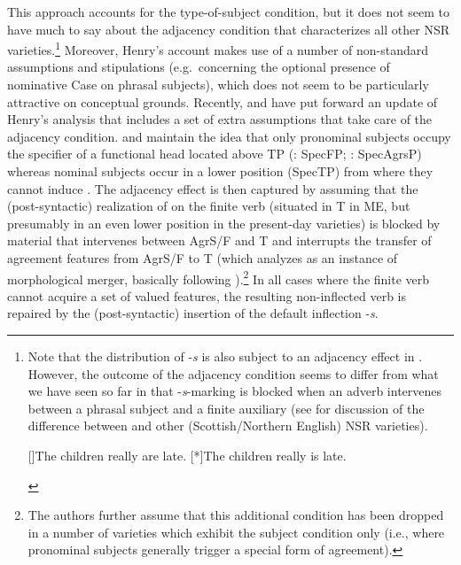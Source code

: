 \documentclass[output=paper]{langsci/langscibook}
\begin{document}
This approach accounts for the type-of-subject condition, but it does not seem
to have much to say about the adjacency condition that characterizes all other
\gls{NSR} varieties.\footnote{Note that the distribution of -\emph{s} is also
    subject to an adjacency effect in . However, the outcome of
    the adjacency condition seems to differ from what we have seen so far in
    that -\emph{s}-marking is blocked when an adverb intervenes between a
    phrasal \Tpl{} subject and a finite auxiliary (see
    \citealt[1116ff.]{AdgerSmith2010} for discussion of the difference between
     and other (Scottish/Northern English) \gls{NSR} varieties).

\begin{exe}
    []{The children really are late.}
    [*]{The children really is late.}
\end{exe}\vspace{-.5\baselineskip}} Moreover, Henry's account makes use of a
number of non-stan\-dard
assumptions and stipulations (e.g.\ concerning the optional presence of
nominative Case on phrasal subjects), which does not seem to be particularly
attractive on conceptual grounds. Recently, \textcite{deHaas:2011} and
\textcite{deHaasandvanKemenade:2015} have put forward an update of Henry's
analysis that includes a set of extra assumptions that take care of the
adjacency condition.  and
\citeauthor{deHaasandvanKemenade:2015} maintain the idea
that only pronominal subjects occupy the specifier of a functional 
head located above TP (\citealt{deHaas:2011}: SpecFP;
\citealt{deHaasandvanKemenade:2015}: \mbox{SpecAgrsP}) whereas nominal subjects
occur in a lower position (SpecTP) from where they cannot induce . The
adjacency effect is then captured by assuming that the (post-syntactic)
realization of  on the finite verb (situated in T in ME, but
presumably in an even lower position in the present-day varieties) is blocked
by material that intervenes between AgrS/F and T and interrupts the transfer of
agreement features from AgrS/F to T (which \citealt[166]{deHaas:2011} analyzes
as an instance of morphological merger, basically following
\citealt{Bobaljik:2002}).\footnote {The authors further assume that this
    additional condition has been dropped in a number of varieties which
    exhibit the subject condition only (i.e., where pronominal subjects
generally trigger a special form of agreement).} In all cases where the finite
verb cannot acquire a set of valued  features, the resulting
non-inflected verb is repaired by the (post-syntactic) insertion of the default
inflection -\emph{s}.
\end{document}
